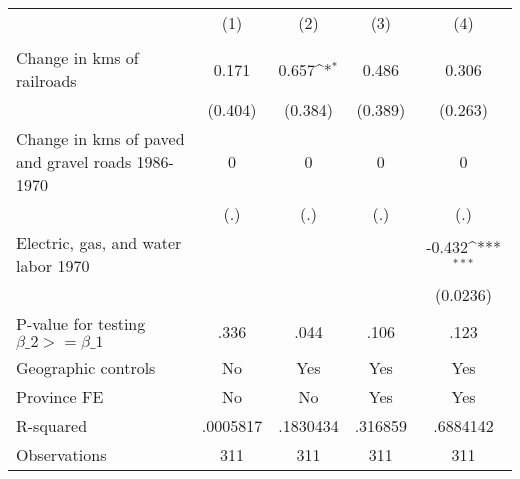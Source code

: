 {
\def\sym#1{\ifmmode^{#1}\else\(^{#1}\)\fi}
\begin{tabular}{l*{4}{c}}
\hline\hline
                &\multicolumn{1}{c}{(1)}&\multicolumn{1}{c}{(2)}&\multicolumn{1}{c}{(3)}&\multicolumn{1}{c}{(4)}\\
                &\multicolumn{1}{c}{}&\multicolumn{1}{c}{}&\multicolumn{1}{c}{}&\multicolumn{1}{c}{}\\
\hline
Change in kms of railroads&    0.171         &    0.657\sym{*}  &    0.486         &    0.306         \\
                &  (0.404)         &  (0.384)         &  (0.389)         &  (0.263)         \\
[1em]
Change in kms of paved and gravel roads 1986-1970&        0         &        0         &        0         &        0         \\
                &      (.)         &      (.)         &      (.)         &      (.)         \\
[1em]
Electric, gas, and water labor 1970&                  &                  &                  &   -0.432\sym{***}\\
                &                  &                  &                  & (0.0236)         \\
\hline
P-value for testing $\beta\_{2} >= \beta\_{1}$&     .336         &     .044         &     .106         &     .123         \\
Geographic controls&       No         &      Yes         &      Yes         &      Yes         \\
Province FE     &       No         &       No         &      Yes         &      Yes         \\
R-squared       & .0005817         & .1830434         &  .316859         & .6884142         \\
Observations    &      311         &      311         &      311         &      311         \\
\hline\hline
\end{tabular}
}
